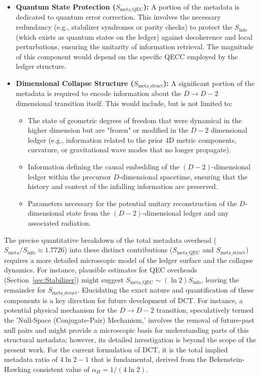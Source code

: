 \documentclass[a4paper, 12pt, oneside]{book}
\numberwithin{equation}{chapter}
\begin{document}
\begin{itemize}
  \item \textbf{Quantum State Protection ($S_{\text{meta\_QEC}}$):} A portion of the metadata is dedicated to quantum error correction. This involves the necessary redundancy (e.g., stabilizer syndromes or parity checks) to protect the $S_{\text{info}}$ (which exists as quantum states on the ledger) against decoherence and local perturbations, ensuring the unitarity of information retrieval. The magnitude of this component would depend on the specific QECC employed by the ledger structure.

  \item \textbf{Dimensional Collapse Structure ($S_{\text{meta\_struct}}$):} A significant portion of the metadata is required to encode information about the $D \to D-2$ dimensional transition itself. This would include, but is not limited to:
        \begin{itemize}
            \item The state of geometric degrees of freedom that were dynamical in the higher dimension but are "frozen" or modified in the $D-2$ dimensional ledger (e.g., information related to the prior 4D metric components, curvature, or gravitational wave modes that no longer propagate).
            \item Information defining the causal embedding of the $(D-2)$-dimensional ledger within the precursor $D$-dimensional spacetime, ensuring that the history and context of the infalling information are preserved.
            \item Parameters necessary for the potential unitary reconstruction of the $D$-dimensional state from the $(D-2)$-dimensional ledger and any associated radiation.
        \end{itemize}
\end{itemize}
The precise quantitative breakdown of the total metadata overhead ($S_{\text{meta}}/S_{\text{info}} \approx 1.7726$) into these distinct contributions ($S_{\text{meta\_QEC}}$ and $S_{\text{meta\_struct}}$) requires a more detailed microscopic model of the ledger surface and the collapse dynamics. For instance, plausible estimates for QEC overheads (Section~\ref{sec:Stabilizer}) might suggest $S_{\text{meta\_QEC}} \sim (\ln 2)S_{\text{info}}$, leaving the remainder for $S_{\text{meta\_struct}}$. Elucidating the exact nature and quantification of these components is a key direction for future development of DCT. For instance, a potential physical mechanism for the $D \to D-2$ transition, speculatively termed the 'Null-Space (Conjugate-Pair) Mechanism,' involves the removal of future-past null pairs and might provide a microscopic basis for understanding parts of this structural metadata; however, its detailed investigation is beyond the scope of the present work. For the current formulation of DCT, it is the total implied metadata ratio of $4\ln 2 - 1$ that is fundamental, derived from the Bekenstein-Hawking consistent value of $\alpha_H = 1/(4\ln 2)$.
\end{document}
